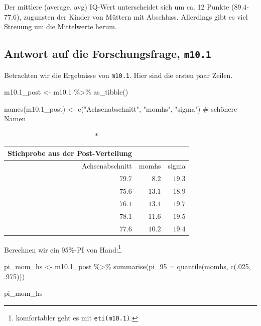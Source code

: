 \documentclass[
  a4paper,
  DIV=11]{scrreprt}
\newenvironment{Shaded}{\begin{snugshade}}{\end{snugshade}}
\newcommand{\AttributeTok}[1]{\textcolor[rgb]{0.40,0.45,0.13}{#1}}
\newcommand{\CommentTok}[1]{\textcolor[rgb]{0.37,0.37,0.37}{#1}}
\newcommand{\DecValTok}[1]{\textcolor[rgb]{0.68,0.00,0.00}{#1}}
\newcommand{\FloatTok}[1]{\textcolor[rgb]{0.68,0.00,0.00}{#1}}
\newcommand{\FunctionTok}[1]{\textcolor[rgb]{0.28,0.35,0.67}{#1}}
\newcommand{\NormalTok}[1]{\textcolor[rgb]{0.00,0.23,0.31}{#1}}
\newcommand{\OtherTok}[1]{\textcolor[rgb]{0.00,0.23,0.31}{#1}}
\newcommand{\SpecialCharTok}[1]{\textcolor[rgb]{0.37,0.37,0.37}{#1}}
\newcommand{\StringTok}[1]{\textcolor[rgb]{0.13,0.47,0.30}{#1}}
\theoremstyle{definition}
\theoremstyle{remark}
\begin{document}
Der mittlere (average, avg) IQ-Wert unterscheidet sich um ca. 12 Punkte
(89.4-77.6), zugunsten der Kinder von Müttern mit Abschluss. Allerdings
gibt es viel Streuung um die Mittelwerte herum.

\hypertarget{antwort-auf-die-forschungsfrage-m10.1}{%
\subsection{\texorpdfstring{Antwort auf die Forschungsfrage,
\texttt{m10.1}}{Antwort auf die Forschungsfrage, m10.1}}\label{antwort-auf-die-forschungsfrage-m10.1}}

Betrachten wir die Ergebnisse von \texttt{m10.1}. Hier sind die ersten
paar Zeilen.

\begin{Shaded}
\begin{Highlighting}[]
\NormalTok{m10}\FloatTok{.1}\NormalTok{\_post }\OtherTok{\textless{}{-}}
\NormalTok{  m10}\FloatTok{.1} \SpecialCharTok{\%\textgreater{}\%} 
  \FunctionTok{as\_tibble}\NormalTok{() }

\FunctionTok{names}\NormalTok{(m10}\FloatTok{.1}\NormalTok{\_post) }\OtherTok{\textless{}{-}} \FunctionTok{c}\NormalTok{(}\StringTok{"Achsenabschnitt"}\NormalTok{, }\StringTok{"momhs"}\NormalTok{, }\StringTok{"sigma"}\NormalTok{)  }\CommentTok{\# schönere Namen}
\end{Highlighting}
\end{Shaded}

\begin{longtable}{rrr}
\caption*{
{\large Stichprobe aus der Post-Verteilung}
} \\ 
\toprule
Achsenabschnitt & momhs & sigma \\ 
\midrule
$79.7$ & $8.2$ & $19.3$ \\ 
$75.6$ & $13.1$ & $18.9$ \\ 
$76.1$ & $13.1$ & $19.7$ \\ 
$78.1$ & $11.6$ & $19.5$ \\ 
$77.6$ & $10.2$ & $19.4$ \\ 
\bottomrule
\end{longtable}

Berechnen wir ein 95\%-PI von Hand:\footnote{komfortabler geht es mit
  \texttt{eti(m10.1)}.}

\begin{Shaded}
\begin{Highlighting}[]
\NormalTok{pi\_mom\_hs }\OtherTok{\textless{}{-}}
\NormalTok{  m10}\FloatTok{.1}\NormalTok{\_post }\SpecialCharTok{\%\textgreater{}\%} 
  \FunctionTok{summarise}\NormalTok{(}\AttributeTok{pi\_95 =} \FunctionTok{quantile}\NormalTok{(momhs, }\FunctionTok{c}\NormalTok{(.}\DecValTok{025}\NormalTok{, .}\DecValTok{975}\NormalTok{)))}

\NormalTok{pi\_mom\_hs}
\end{Highlighting}
\end{Shaded}
\end{document}
